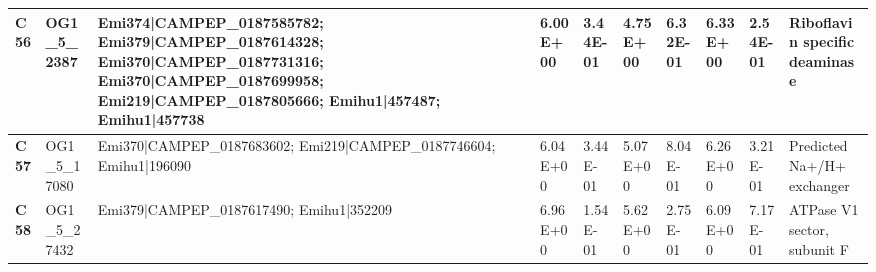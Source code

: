 \begin{landscape}
\begin{center}
\begin{footnotesize}
\begin{longtable}{|p{0.5cm}|p{1.5cm}|p{4cm}|l|l|l|l|l|l|l|}
\textbf{C56} & OG1\_5\_2387  & Emi374|CAMPEP\_0187585782; Emi379|CAMPEP\_0187614328; Emi370|CAMPEP\_0187731316; Emi370|CAMPEP\_0187699958; Emi219|CAMPEP\_0187805666; Emihu1|457487; Emihu1|457738                                                                                                                                                                                                                                                                                                                                                                                                                                                                      & 6.00E+00  & 3.44E-01 & 4.75E+00  & 6.32E-01 & 6.33E+00  & 2.54E-01 & Riboflavin specific deaminase                                                \\ \hline
\textbf{C57} & OG1\_5\_17080 & Emi370|CAMPEP\_0187683602; Emi219|CAMPEP\_0187746604; Emihu1|196090                                                                                                                                                                                                                                                                                                                                                                                                                                                                                                                                                                      & 6.04E+00  & 3.44E-01 & 5.07E+00  & 8.04E-01 & 6.26E+00  & 3.21E-01 & Predicted Na+/H+ exchanger                                                   \\ \hline
\textbf{C58} & OG1\_5\_27432 & Emi379|CAMPEP\_0187617490; Emihu1|352209                                                                                                                                                                                                                                                                                                                                                                                                                                                                                                                                                                                                 & 6.96E+00  & 1.54E-01 & 5.62E+00  & 2.75E-01 & 6.09E+00  & 7.17E-01 & ATPase V1 sector, subunit F                                                  \\ \hline

\end{longtable}
\end{footnotesize}
\end{center}
\end{landscape}
